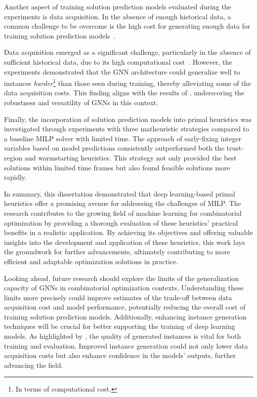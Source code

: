 Another aspect of training solution prediction models evaluated during the experiments is data acquisition.
In the absence of enough historical data, a common challenge to be overcome is the high cost for generating enough data for training solution prediction models~\cite{bengioMachineLearningCombinatorial2021,cappartCombinatorialOptimizationReasoning2022,pmlr-v119-yehuda20a}.

Data acquisition emerged as a significant challenge, particularly in the absence of sufficient historical data, due to its high computational cost~\cite{bengioMachineLearningCombinatorial2021,cappartCombinatorialOptimizationReasoning2022,pmlr-v119-yehuda20a}.
However, the experiments demonstrated that the GNN architecture could generalize well to instances \emph{harder}\footnote{In terms of computational cost.} than those seen during training, thereby alleviating some of the data acquisition costs.
This finding aligns with the results of , underscoring the robustness and versatility of GNNs in this context.

Finally, the incorporation of solution prediction models into primal heuristics was investigated through experiments with three matheuristic strategies compared to a baseline MILP solver with limited time.
The approach of early-fixing integer variables based on model predictions consistently outperformed both the trust-region and warmstarting heuristics.
This strategy not only provided the best solutions within limited time frames but also found feasible solutions more rapidly.

In summary, this dissertation demonstrated that deep learning-based primal heuristics offer a promising avenue for addressing the challenges of MILP.
The research contributes to the growing field of machine learning for combinatorial optimization by providing a thorough evaluation of these heuristics' practical benefits in a realistic application.
By achieving its objectives and offering valuable insights into the development and application of these heuristics, this work lays the groundwork for further advancements, ultimately contributing to more efficient and adaptable optimization solutions in practice.

Looking ahead, future research should explore the limits of the generalization capacity of GNNs in combinatorial optimization contexts.
Understanding these limits more precisely could improve estimates of the trade-off between data acquisition cost and model performance, potentially reducing the overall cost of training solution prediction models.
Additionally, enhancing instance generation techniques will be crucial for better supporting the training of deep learning models.
As highlighted by , the quality of generated instances is vital for both training and evaluation.
Improved instance generation could not only lower data acquisition costs but also enhance confidence in the models' outputs, further advancing the field.

